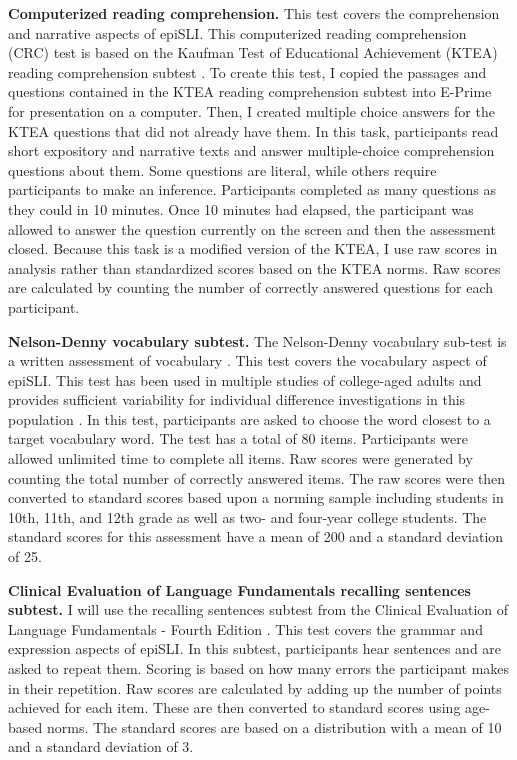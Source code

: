 \documentclass[../dissertation.tex]{subfiles}
\begin{document}
	\textbf{Computerized reading comprehension.} This test covers the comprehension and narrative aspects of epiSLI. This computerized reading comprehension (CRC) test is based on the Kaufman Test of Educational Achievement (KTEA) reading comprehension subtest \citep{Kaufman2004}. To create this test, I copied the passages and questions contained in the KTEA reading comprehension subtest into E-Prime \citep{schneider2002prime} for presentation on a computer. Then, I created multiple choice answers for the KTEA questions that did not already have them. In this task, participants read short expository and narrative texts and answer multiple-choice comprehension questions about them. Some questions are literal, while others require participants to make an inference. Participants completed as many questions as they could in 10 minutes. Once 10 minutes had elapsed, the participant was allowed to answer the question currently on the screen and then the assessment closed. Because this task is a modified version of the KTEA, I use raw scores in analysis rather than standardized scores based on the KTEA norms. Raw scores are calculated by counting the number of correctly answered questions for each participant.  \par
	\textbf{Nelson-Denny vocabulary subtest.} The Nelson-Denny vocabulary sub-test is a written assessment of vocabulary \citep{Brown1981}. This test covers the vocabulary aspect of epiSLI. This test has been used in multiple studies of college-aged adults and provides sufficient variability for individual difference investigations in this population \citetext{e.g., \citealt{Boudewyn2015}; \citealt{Stafura2014}}. In this test, participants are asked to choose the word closest to a target vocabulary word. The test has a total of 80 items. Participants were allowed unlimited time to complete all items. Raw scores were generated by counting the total number of correctly answered items. The raw scores were then converted to standard scores based upon a norming sample including students in 10th, 11th, and 12th grade as well as two- and four-year college students. The standard scores for this assessment have a mean of 200 and a standard deviation of 25. \par
	\textbf{Clinical Evaluation of Language Fundamentals recalling sentences subtest.} I will use the recalling sentences subtest from the Clinical Evaluation of Language Fundamentals - Fourth Edition \citetext{CELF; \citealt{Semel2006}}. This test covers the grammar and expression aspects of epiSLI. In this subtest, participants hear sentences and are asked to repeat them. Scoring is based on how many errors the participant makes in their repetition. Raw scores are calculated by adding up the number of points achieved for each item. These are then converted to standard scores using age-based norms. The standard scores are based on a distribution with a mean of 10 and a standard deviation of 3. \par
\end{document}
